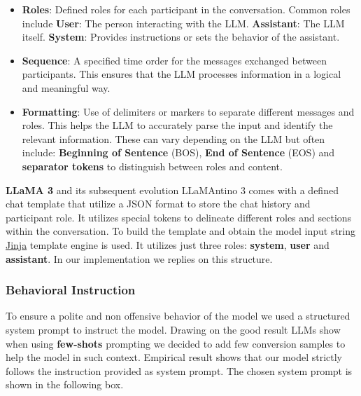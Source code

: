 \documentclass{article}
\begin{document}
	\begin{itemize}
		\item \textbf{Roles}: Defined roles for each participant in the conversation. Common roles include
			\subitem \textbf{User}: The person interacting with the LLM.
			\subitem \textbf{Assistant}: The LLM itself.
			\subitem \textbf{System}: Provides instructions or sets the behavior of the assistant.
		\item \textbf{Sequence}: A specified time order for the messages exchanged between participants. This ensures that the LLM processes information in a logical and meaningful way.
		\item \textbf{Formatting}: Use of delimiters or markers to separate different messages and roles. This helps the LLM to accurately parse the input and identify the relevant information. These can vary depending on the LLM but often include: \textbf{Beginning of Sentence} (BOS), \textbf{End of Sentence} (EOS) and \textbf{separator tokens} to distinguish between roles and content.
	\end{itemize}
	
	\textbf{LLaMA 3} and its subsequent evolution LLaMAntino 3 comes with a defined chat template that utilize a JSON format to store the chat history and participant role. It utilizes special tokens to delineate different roles and sections within the conversation. To build the template and obtain the model input string \href{https://jinja.palletsprojects.com/en/stable/}{Jinja} template engine is used.
	It utilizes just three roles: \textbf{system}, \textbf{user} and \textbf{assistant}.  
	In our implementation we replies on this structure.
	
	\subsubsection{Behavioral Instruction}
	To ensure a polite and non offensive behavior of the model we used a structured system prompt to instruct the model. Drawing on the good result LLMs show when using \textbf{few-shots} prompting we decided to add few conversion samples to help the model in such context.
	Empirical result shows that our model strictly follows the instruction provided as system prompt. The chosen system prompt is shown in the following box.
	
\end{document}
